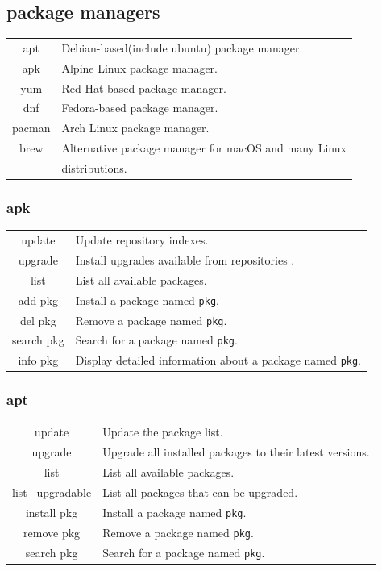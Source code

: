 \documentclass[10pt]{article}
\begin{document}
\begin{multicols}{2}
\subsection{package managers}
\begin{tabular}{C L}
    apt     & Debian-based(include ubuntu) package manager. \\
    apk     & Alpine Linux package manager. \\
    yum     & Red Hat-based package manager. \\
    dnf     & Fedora-based package manager. \\
    pacman  & Arch Linux package manager. \\
    brew    & Alternative package manager for macOS and many Linux\\
            & distributions. \\
\end{tabular}

\subsubsection{apk}
\begin{tabular}{C L}
    update              & Update repository indexes. \\
    upgrade             & Install upgrades available from repositories . \\
    list                & List all available packages. \\
    add pkg             & Install a package named \texttt{pkg}. \\
    del pkg             & Remove a package named \texttt{pkg}. \\
    search pkg          & Search for a package named \texttt{pkg}. \\
    info pkg            & Display detailed information about a package named \texttt{pkg}. \\
\end{tabular}

\subsubsection{apt}
\begin{tabular}{C L}
    update              & Update the package list. \\
    upgrade             & Upgrade all installed packages to their latest versions. \\
    list                & List all available packages. \\
    list --upgradable   & List all packages that can be upgraded. \\
    install pkg         & Install a package named \texttt{pkg}. \\
    remove pkg          & Remove a package named \texttt{pkg}. \\
    search pkg          & Search for a package named \texttt{pkg}. \\
\end{tabular}


\end{multicols}
\end{document}
